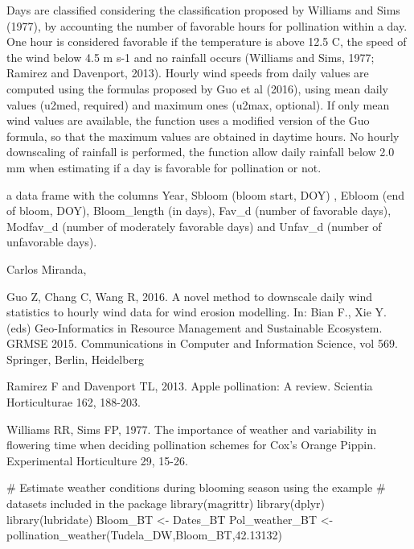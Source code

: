 \documentclass[a4paper]{book}
\begin{document}
%
\begin{Details}\relax
Days are classified considering the classification proposed by
Williams and Sims (1977), by accounting the number of favorable
hours for pollination within a day. One hour is considered favorable
if the temperature is above 12.5 C, the speed of the wind below
4.5 m s-1 and no rainfall occurs (Williams and Sims, 1977; Ramirez and
Davenport, 2013). Hourly wind speeds from daily values are computed
using the formulas proposed by Guo et al (2016), using mean daily
values (u2med, required) and maximum ones (u2max, optional). If 
only mean wind values are available, the function uses a modified
version of the Guo formula, so that the maximum values are obtained in 
daytime hours. No hourly downscaling of rainfall is performed, the 
function allow daily rainfall below 2.0 mm when estimating if a day
is favorable for pollination or not.
\end{Details}
%
\begin{Value}
a data frame with the columns Year, Sbloom (bloom start, DOY)
, Ebloom (end of bloom, DOY), Bloom\_length (in days), Fav\_d (number of
favorable days), Modfav\_d (number of moderately favorable days) and
Unfav\_d (number of unfavorable days).
\end{Value}
%
\begin{Author}\relax
Carlos Miranda, 
\end{Author}
%
\begin{References}\relax
Guo Z, Chang C, Wang R, 2016. A novel method to downscale daily wind
statistics to hourly wind data for wind erosion modelling. In: Bian F.,
Xie Y. (eds) Geo-Informatics in Resource Management and Sustainable
Ecosystem. GRMSE 2015. Communications in Computer and Information Science,
vol 569. Springer, Berlin, Heidelberg

Ramirez F and Davenport TL, 2013. Apple pollination: A review. Scientia
Horticulturae 162, 188-203.

Williams RR, Sims FP, 1977. The importance of weather and variability
in flowering time when deciding pollination schemes for Cox's Orange
Pippin. Experimental Horticulture 29, 15-26.
\end{References}
%
\begin{Examples}
\begin{ExampleCode}

# Estimate weather conditions during blooming season using the example
# datasets included in the package
library(magrittr)
library(dplyr)
library(lubridate)
Bloom_BT <- Dates_BT %
Pol_weather_BT <- pollination_weather(Tudela_DW,Bloom_BT,42.13132)

\end{ExampleCode}
\end{Examples}
\end{document}
